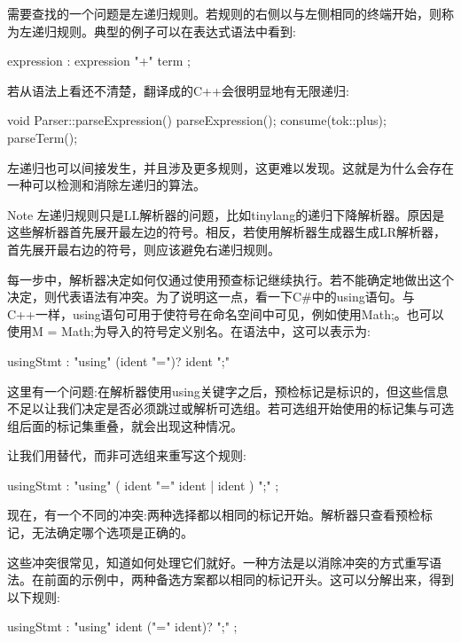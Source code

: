 需要查找的一个问题是左递归规则。若规则的右侧以与左侧相同的终端开始，则称为左递归规则。典型的例子可以在表达式语法中看到:

\begin{shell}
expression : expression "+" term ;
\end{shell}

若从语法上看还不清楚，翻译成的C++会很明显地有无限递归:

\begin{cpp}
void Parser::parseExpression() {
    parseExpression();
    consume(tok::plus);
    parseTerm();
}
\end{cpp}

左递归也可以间接发生，并且涉及更多规则，这更难以发现。这就是为什么会存在一种可以检测和消除左递归的算法。

\begin{myNotic}{Note}
左递归规则只是LL解析器的问题，比如tinylang的递归下降解析器。原因是这些解析器首先展开最左边的符号。相反，若使用解析器生成器生成LR解析器，首先展开最右边的符号，则应该避免右递归规则。
\end{myNotic}

每一步中，解析器决定如何仅通过使用预查标记继续执行。若不能确定地做出这个决定，则代表语法有冲突。为了说明这一点，看一下C\#中的using语句。与C++一样，using语句可用于使符号在命名空间中可见，例如使用Math;。也可以使用M = Math;为导入的符号定义别名。在语法中，这可以表示为:

\begin{shell}
usingStmt : "using" (ident "=")? ident ";"
\end{shell}

这里有一个问题:在解析器使用using关键字之后，预检标记是标识的，但这些信息不足以让我们决定是否必须跳过或解析可选组。若可选组开始使用的标记集与可选组后面的标记集重叠，就会出现这种情况。

让我们用替代，而非可选组来重写这个规则:

\begin{shell}
usingStmt : "using" ( ident "=" ident | ident ) ";" ;
\end{shell}

现在，有一个不同的冲突:两种选择都以相同的标记开始。解析器只查看预检标记，无法确定哪个选项是正确的。

这些冲突很常见，知道如何处理它们就好。一种方法是以消除冲突的方式重写语法。在前面的示例中，两种备选方案都以相同的标记开头。这可以分解出来，得到以下规则:

\begin{shell}
usingStmt : "using" ident ("=" ident)? ";" ;
\end{shell}

